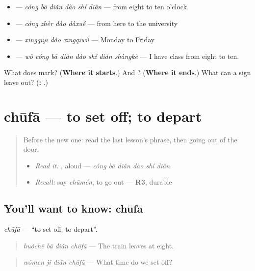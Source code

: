 \begin{itemize}
\raggedright
  \item {} — \emph{cóng bā diǎn dào shí diǎn} — from eight to ten o'clock
  \item {} — \emph{cóng zhèr dào dàxué} — from here to the university
  \item {} — \emph{xīngqīyī dào xīngqīwǔ} — Monday to Friday
  \item {} — \emph{wǒ cóng bā diǎn dào shí diǎn shàngkè} — I have class from eight to ten.
\end{itemize}

\begin{tcolorbox}[breakable,colback=teal!4,colframe=teal!35!black,title={Before you move on}]
What does  mark? (\textbf{Where it starts}.) And ? (\textbf{Where it ends}.) What can a sign leave out? (\textbf{: }.)
\end{tcolorbox}
\section[chūfā]{chūfā — to set off; to depart}

\label{lesson:ZH-C155-chufa}



\begin{quote}
Before the new one: read the last lesson's phrase, then going out of the door.

\begin{itemize}
\raggedright
  \item \emph{Read it:} , aloud — \emph{cóng bā diǎn dào shí diǎn}
  \item \emph{Recall:} say \emph{chūmén}, to go out — \textbf{R3}, durable
\end{itemize}
\end{quote}

\subsection*{You'll want to know: chūfā}
\emph{chūfā} — \textquotedblleft{}to set off; to depart\textquotedblright{}.

\begin{quote}
\emph{huǒchē bā diǎn chūfā} — The train leaves at eight.
\end{quote}

\begin{quote}
\emph{wǒmen jǐ diǎn chūfā} — What time do we set off?
\end{quote}

